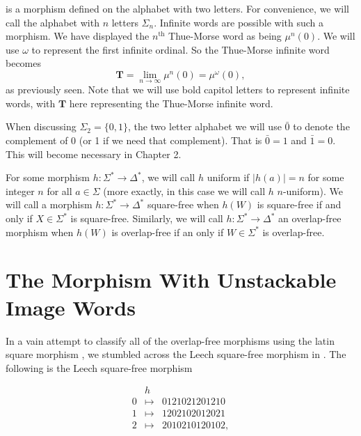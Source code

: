 \documentclass[12pt]{amsart}
\theoremstyle{definition}
\theoremstyle{plain}
\theoremstyle{nameit}
\theoremstyle{plain}
\begin{document}
\begin{onehalfspace}
\noindent
is a morphism defined on the alphabet with two letters. For convenience, we will call the alphabet with $n
$ letters $\Sigma_n$. Infinite words are possible with such a morphism. We have displayed the $n^
\mathrm{th}$ Thue-Morse word as being $\mu^n(0)$. We will use $\omega$ to represent the first infinite
ordinal. So the Thue-Morse infinite word becomes
\[\mathbf{T} = \lim_{n\to\infty}\mu^n(0) = \mu^\omega (0),\]
 as previously seen. Note that we will use bold capitol letters to represent infinite words, with $\mathbf{T}$
here representing
the Thue-Morse infinite word.

When discussing $\Sigma_2 = \{0,1\}$, the two letter alphabet we will use $\bar{0}$ to denote
the complement of 0 (or 1 if we need that complement). That is $\bar{0}=1$ and $\bar{1}=0$. This will
become necessary in Chapter 2.

For some morphism $h:\Sigma^*\to\Delta^*$, we will call $h$ uniform if $|h(a)| = n$ for some integer $n$
for all $a\in\Sigma$ (more exactly, in this case we will call $h$ $n$-uniform).  We will call a morphism $h:
\Sigma^*\to\Delta^*$ square-free when $h(W)$ is square-free if and only if $X\in\Sigma^*$ is square-free.
Similarly, we will call $h:\Sigma^*\to\Delta^*$ an overlap-free morphism when $h(W)$ is overlap-free if
an only if $W\in\Sigma^*$ is overlap-free.


\section{The Morphism With Unstackable Image Words}

In a vain attempt to classify all of the overlap-free morphisms using the latin square morphism
\cite{tompkins}, we stumbled across the Leech square-free morphism in \cite{albook}. The following is the
Leech square-free morphism

\begin{singlespace}
\begin{eqnarray*}
&h&\\
0 & \mapsto & 0121021201210\\
1 & \mapsto & 1202102012021\\
2 & \mapsto & 2010210120102,
\end{eqnarray*}
\end{singlespace}


\end{onehalfspace}
\end{document}

